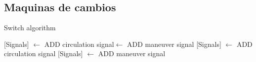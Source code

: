 \subsection{Maquinas de cambios}

\lipsum[1]

\begin{algorithm}[hbt!]
            \caption{Switch algorithm}\label{alg:SW}
            \DontPrintSemicolon
            \SetNoFillComment
            \LinesNotNumbered 
            {
                {
                    {
                        [Signals] $\gets$ ADD circulation signal\;
                        [Signals] $\gets$ ADD maneuver signal\;
                    }
                    {
                        [Signals] $\gets$ ADD circulation signal\;
                    }
                    {
                        [Signals] $\gets$ ADD maneuver signal\;
                    }
                }   
            }
            \KwResult{[Signals]} 
        \end{algorithm}